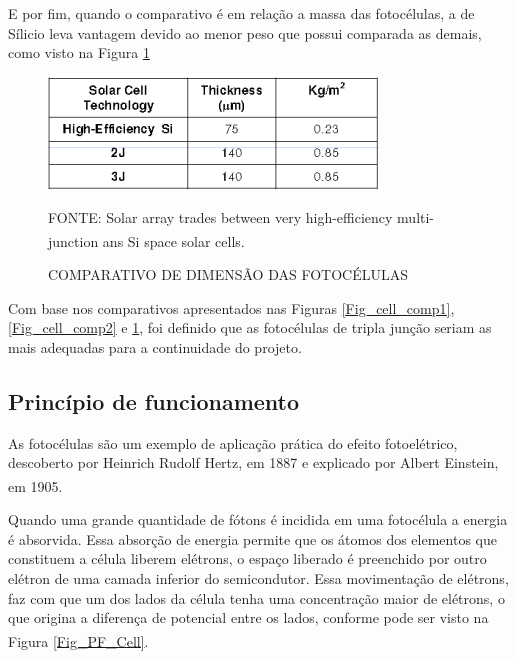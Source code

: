 \documentclass[
	12pt,				%
	openright,			%
	oneside,			%
	a4paper,			%
	english,			%
	french,				%
	spanish,			%
	brazil,				%
	oldfontcommands
	]{abntex2}
\begin{document}
	E por fim, quando o comparativo é em relação a massa das fotocélulas, a de Sílicio leva vantagem devido ao menor peso que possui comparada as demais, como visto na Figura \ref{Fig_cell_comp3}
	
	\begin{figure}[th]
		\caption{COMPARATIVO DE DIMENSÃO DAS FOTOCÉLULAS}
		\label{Fig_cell_comp3}
		\centering
		\includegraphics[width=0.6\linewidth]{./figs/cell_comp3}
			
		\begin{small}
			FONTE: Solar array trades between very high-efficiency multi-junction ans Si space solar cells.\textsuperscript{\cite{Fatemi}}
		\end{small}		
	\end{figure}
	
	Com base nos comparativos apresentados nas Figuras \ref{Fig_cell_comp1}, \ref{Fig_cell_comp2} e \ref{Fig_cell_comp3}, foi definido que as fotocélulas de tripla junção seriam as mais adequadas para a continuidade do projeto.
	
\subsection[Princípio de funcionamento]{Princípio de funcionamento}

	As fotocélulas são um exemplo de aplicação prática do efeito fotoelétrico, descoberto por Heinrich Rudolf Hertz, em 1887 e explicado por Albert Einstein, em 1905.\textsuperscript{\cite{celula}}
	
	Quando uma grande quantidade de fótons é incidida em uma fotocélula a energia é absorvida. Essa absorção de energia permite que os átomos dos elementos que constituem a célula liberem elétrons, o espaço liberado é preenchido por outro elétron de uma camada inferior do semicondutor. Essa movimentação de elétrons, faz com que um dos lados da célula tenha uma concentração maior de elétrons, o que origina a diferença de potencial entre os lados, conforme pode ser visto na Figura \ref{Fig_PF_Cell}.\textsuperscript{\cite{celula2}}
	
\end{document}
